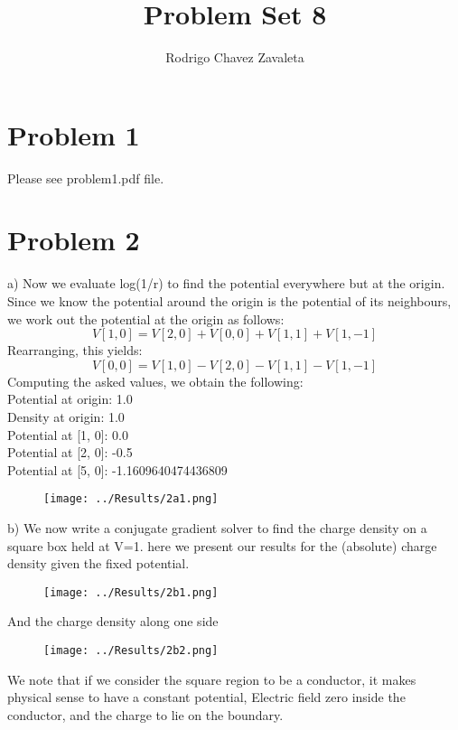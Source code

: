 \documentclass[]{article}
\title{Problem Set 8}
\author{Rodrigo Chavez Zavaleta}
\begin{document}
\maketitle

\section{Problem 1}
Please see problem1.pdf file.

\section{Problem 2}

a) Now we evaluate log(1/r) to find the potential everywhere but at the origin. Since we know the potential around the origin is the potential of its neighbours, we work out the potential at the origin as follows:
$$
	V[1,0] = V[2,0] + V[0,0] + V[1,1] + V[1,-1]
$$
Rearranging, this yields:
$$
	V[0,0] = V[1,0] - V[2,0] - V[1,1] - V[1,-1]
$$
Computing the asked values, we obtain the following:
\\
Potential at origin: 1.0\\
Density at origin: 1.0\\
Potential at [1, 0]: 0.0\\
Potential at [2, 0]: -0.5\\
Potential at [5, 0]: -1.1609640474436809\\

\begin{figure}[h!]
	\centering
	\texttt{[image: ../Results/2a1.png]}
\end{figure}

\newpage
b) We now write a conjugate gradient solver to find the charge density on a square box held at V=1. here we present our results for the (absolute) charge density given the fixed potential.

\begin{figure}[h!]
	\centering
	\texttt{[image: ../Results/2b1.png]}
\end{figure}

And the charge density along one side

\begin{figure}[h!]
	\centering
	\texttt{[image: ../Results/2b2.png]}
\end{figure}

We note that if we consider the square region to be a conductor, it makes physical sense to have a constant potential, Electric field zero inside the conductor, and the charge to lie on the boundary.
\end{document}
